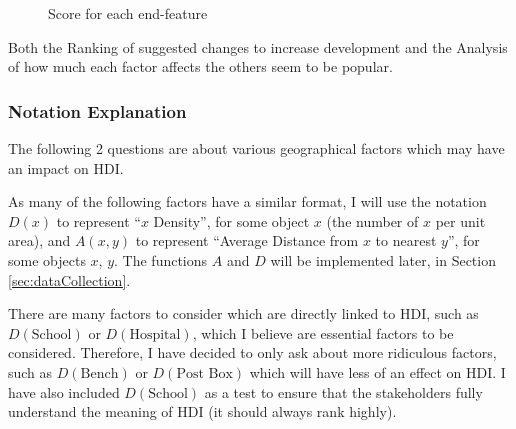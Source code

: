\documentclass[12pt]{report}
\begin{document}
\begin{figure}[H]
\centering
{}
\caption{Score for each end-feature}
\end{figure}
Both the Ranking of suggested changes to increase development and the Analysis of how much each factor affects the others seem to be popular.

\subsubsection{Notation Explanation}
The following 2 questions are about various geographical factors which may have an impact on HDI.

As many of the following factors have a similar format, I will use the notation $D\left(x\right)$ to represent ``$x$ Density'', for some object $x$ (the number of $x$ per unit area), and $A\left(x,y\right)$ to represent ``Average Distance from $x$ to nearest $y$'', for some objects $x$, $y$. The functions $A$ and $D$ will be implemented later, in Section \ref{sec:dataCollection}.

There are many factors to consider which are directly linked to HDI, such as $D\left(\text{School}\right)$ or $D\left(\text{Hospital}\right)$, which I believe are essential factors to be considered. Therefore, I have decided to only ask about more ridiculous factors, such as $D\left(\text{Bench}\right)$ or $D\left(\text{Post Box}\right)$ which will have less of an effect on HDI. I have also included $D\left(\text{School}\right)$ as a test to ensure that the stakeholders fully understand the meaning of HDI (it should always rank highly).
\end{document}
